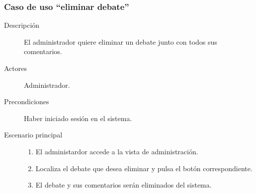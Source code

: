 \subsubsection{Caso de uso ``eliminar debate''}
\begin{description}
\item[Descripción] El administrador quiere eliminar un debate junto con todos sus comentarios.
\item[Actores] Administrador.
\item[Precondiciones] Haber iniciado sesión en el sistema.
\item[Escenario principal] \hfill
						 	\begin{enumerate}
							\item El administardor accede a la vista de administración.
							\item Localiza el debate que desea eliminar y pulsa el botón correspondiente.
							\item El debate y sus comentarios serán eliminados del sistema.
							\end{enumerate}
\end{description}